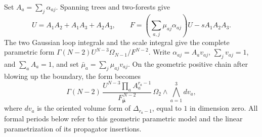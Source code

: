 \documentclass[11pt,a4paper,oneside]{article}
\theoremstyle{plain}
\theoremstyle{definition}
\theoremstyle{remark}
\numberwithin{equation}{section}
\begin{document}
Set $A_a=\sum_j\alpha_{aj}$. Spanning trees and two-forests give
\begin{equation}\label{unified:eq:thetaUF}
 U=A_1A_2+A_1A_3+A_2A_3,\qquad
 F=\left(\sum_{a,j}\mu_{aj}\alpha_{aj}\right)U-sA_1A_2A_3 .
\end{equation}
The two Gaussian loop integrals and the scale integral give the complete parametric form
$\Gamma(N-2)U^{N-3}\Omega_{N-1}/F^{N-2}$.
Write $\alpha_{aj}=A_av_{aj}$, $\sum_jv_{aj}=1$, and
$\sum_a A_a=1$, and set $\bar\mu_a=\sum_j\mu_{aj}v_{aj}$.
On the geometric positive chain after blowing up the boundary, the form becomes
\begin{equation}\label{unified:eq:thetaproduct}
 \Gamma(N-2)\,
 \frac{U^{N-3}\prod_a A_a^{r_a-1}}
      {F_{\bar{\boldsymbol\mu}}^{\,N-2}}\,
 \Omega_2\wedge\bigwedge_{a=1}^3 dv_a ,
\end{equation}
where $dv_a$ is the oriented volume form of $\Delta_{r_a-1}$, equal to $1$ in dimension zero.
All formal periods below refer to this geometric parametric model and the linear parametrization of its propagator insertions.
\end{document}
